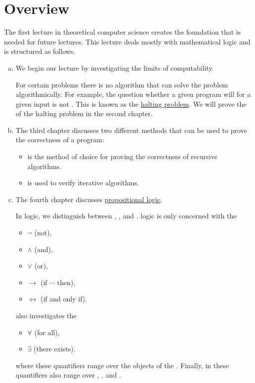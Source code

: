 \section{Overview} 
The first lecture in theoretical computer science creates the foundation that is needed for future lectures.
This lecture deals mostly with mathematical logic and is structured as follows.
\begin{enumerate}[(a)]
\item We begin our lecture by investigating the limits of computability.

      For certain problems there is no algorithm that can solve the problem algorithmically. 
      For example, the question whether a given program will  for a given input is not
      .  This is known as the \href{https://en.wikipedia.org/wiki/Halting_problem}{halting problem}.  
      We will prove the  of the halting problem in the second chapter. 
\item The third chapter discusses two different methods that can be used to prove the correctness of a program:
      \begin{itemize}
      \item {} is the method of choice for proving the correctness of recursive
            algorithms.
      \item {} is used to verify iterative algorithms.
      \end{itemize}
\item The fourth chapter discusses \href{https://en.wikipedia.org/wiki/Propositional_calculus}{propositional logic}.

      In logic, we distinguish between  ,
      , and .   logic is only
      concerned with the 
      \begin{itemize}
      \item $\neg$ (not), 
      \item $\wedge$ (and),
      \item $\vee$ (or),
      \item $\rightarrow$ (if $\cdots$ then),
      \item $\leftrightarrow$ (if and only if).
      \end{itemize}
       also investigates the 
      \begin{itemize}
      \item $\forall$ (for all),
      \item $\exists$ (there exists).
      \end{itemize}
      \hspace*{1.3cm}
      where these quantifiers range over the objects of the .
      Finally, in  these quantifiers also range over , , and
      . 


\end{enumerate}
